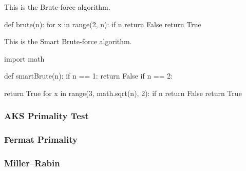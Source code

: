 \documentclass[main.tex]{subfiles}
\begin{document}
This is the Brute-force algorithm.

\begin{python}
    def brute(n):
        for x in range(2, n):
            if n %
                return False
        return True
\end{python}

\vspace{10mm}

This is the Smart Brute-force algorithm.

\begin{python}
    import math

    def smartBrute(n):
        if n == 1:
            return False
        if n == 2:

            return True
        for x in range(3, math.sqrt(n), 2):
            if n %
                return False
        return True
\end{python}

\subsubsection{AKS Primality Test}

\subsubsection{Fermat Primality}

\subsubsection{Miller–Rabin}
\end{document}
